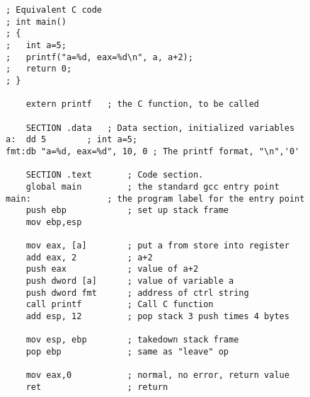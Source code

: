 \begin{lstlisting}[basicstyle=\ttfamily\small, frame=single]
; Equivalent C code
; int main()
; {
;   int a=5;
;   printf("a=%d, eax=%d\n", a, a+2);
;   return 0;
; }

    extern printf	; the C function, to be called

    SECTION .data	; Data section, initialized variables
a:  dd 5		; int a=5;
fmt:db "a=%d, eax=%d", 10, 0 ; The printf format, "\n",'0'

    SECTION .text       ; Code section.
    global main         ; the standard gcc entry point
main:               ; the program label for the entry point
    push ebp            ; set up stack frame
    mov ebp,esp

    mov eax, [a]        ; put a from store into register
    add eax, 2          ; a+2
    push eax            ; value of a+2
    push dword [a]      ; value of variable a
    push dword fmt      ; address of ctrl string
    call printf         ; Call C function
    add esp, 12         ; pop stack 3 push times 4 bytes

    mov esp, ebp        ; takedown stack frame
    pop ebp             ; same as "leave" op

    mov	eax,0           ; normal, no error, return value
    ret	                ; return
\end{lstlisting}

